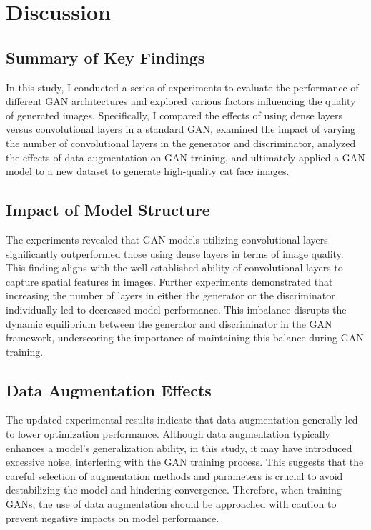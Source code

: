 \chapter{Discussion}
\label{Discussion}

\section{Summary of Key Findings}

In this study, I conducted a series of experiments to evaluate the performance of different GAN architectures and explored various factors influencing the quality of generated images. Specifically, I compared the effects of using dense layers versus convolutional layers in a standard GAN, examined the impact of varying the number of convolutional layers in the generator and discriminator, analyzed the effects of data augmentation on GAN training, and ultimately applied a GAN model to a new dataset to generate high-quality cat face images.

\section{Impact of Model Structure}

The experiments revealed that GAN models utilizing convolutional layers significantly outperformed those using dense layers in terms of image quality. This finding aligns with the well-established ability of convolutional layers to capture spatial features in images. Further experiments demonstrated that increasing the number of layers in either the generator or the discriminator individually led to decreased model performance. This imbalance disrupts the dynamic equilibrium between the generator and discriminator in the GAN framework, underscoring the importance of maintaining this balance during GAN training.

\section{Data Augmentation Effects}

The updated experimental results indicate that data augmentation generally led to lower optimization performance. Although data augmentation typically enhances a model’s generalization ability, in this study, it may have introduced excessive noise, interfering with the GAN training process. This suggests that the careful selection of augmentation methods and parameters is crucial to avoid destabilizing the model and hindering convergence. Therefore, when training GANs, the use of data augmentation should be approached with caution to prevent negative impacts on model performance.

